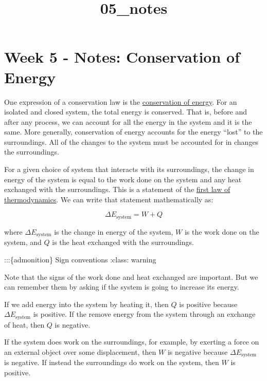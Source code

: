 \documentclass[11pt]{article}
\title{05\_notes}
\begin{document}
    
    \maketitle
    
    

    
    \section{Week 5 - Notes: Conservation of
Energy}\label{week-5---notes-conservation-of-energy}

One expression of a conservation law is the
\href{https://en.wikipedia.org/wiki/Conservation_of_energy}{conservation
of energy}. For an isolated and closed system, the total energy is
conserved. That is, before and after any process, we can account for all
the energy in the system and it is the same. More generally,
conservation of energy accounts for the energy ``lost'' to the
surroundings. All of the changes to the system must be accounted for in
changes the surroundings.

For a given choice of system that interacts with its surroundings, the
change in energy of the system is equal to the work done on the system
and any heat exchanged with the surroundings. This is a statement of the
\href{https://en.wikipedia.org/wiki/First_law_of_thermodynamics}{first
law of thermodynamics}. We can write that statement mathematically as:

\[\Delta E_{\text{system}} = W + Q\]

where \(\Delta E_{\text{system}}\) is the change in energy of the
system, \(W\) is the work done on the system, and \(Q\) is the heat
exchanged with the surroundings.

:::\{admonition\} Sign conventions :class: warning

Note that the signs of the work done and heat exchanged are important.
But we can remember them by asking if the system is going to increase
its energy.

If we add energy into the system by heating it, then \(Q\) is positive
because \(\Delta E_{\text{system}}\) is positive. If the remove energy
from the system through an exchange of heat, then \(Q\) is negative.

If the system does work on the surroundings, for example, by exerting a
force on an external object over some displacement, then \(W\) is
negative because \(\Delta E_{\text{system}}\) is negative. If instead
the surroundings do work on the system, then \(W\) is positive.
\end{document}
